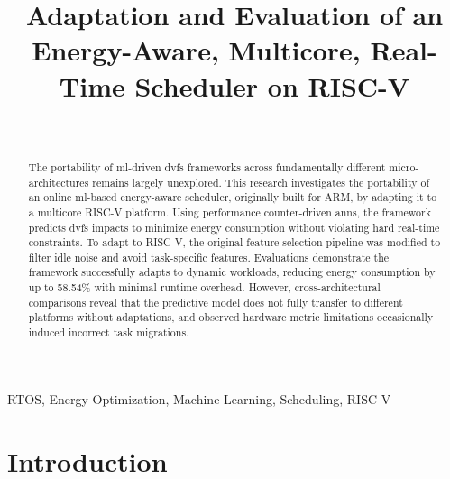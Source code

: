 \documentclass[journal]{IEEEtran}
\begin{document}
\title{Adaptation and Evaluation of an Energy-Aware, Multicore, Real-Time Scheduler on RISC-V}

\author{
     \\
}

\maketitle

\IEEEpeerreviewmaketitle

\begin{abstract}
    The portability of \gls{ml}-driven \gls{dvfs} frameworks across fundamentally different micro-architectures remains largely unexplored. This research investigates the portability of an online \gls{ml}-based energy-aware scheduler, originally built for ARM, by adapting it to a multicore RISC-V platform. Using performance counter-driven \glspl{ann}, the framework predicts \gls{dvfs} impacts to minimize energy consumption without violating hard real-time constraints. To adapt to RISC-V, the original feature selection pipeline was modified to filter idle noise and avoid task-specific features. Evaluations demonstrate the framework successfully adapts to dynamic workloads, reducing energy consumption by up to 58.54\% with minimal runtime overhead. However, cross-architectural comparisons reveal that the predictive model does not fully transfer to different platforms without adaptations, and observed hardware metric limitations occasionally induced incorrect task migrations.
\end{abstract}

\begin{IEEEkeywords}
RTOS, Energy Optimization, Machine Learning, Scheduling, RISC-V
\end{IEEEkeywords}

\section{Introduction}
\end{document}
